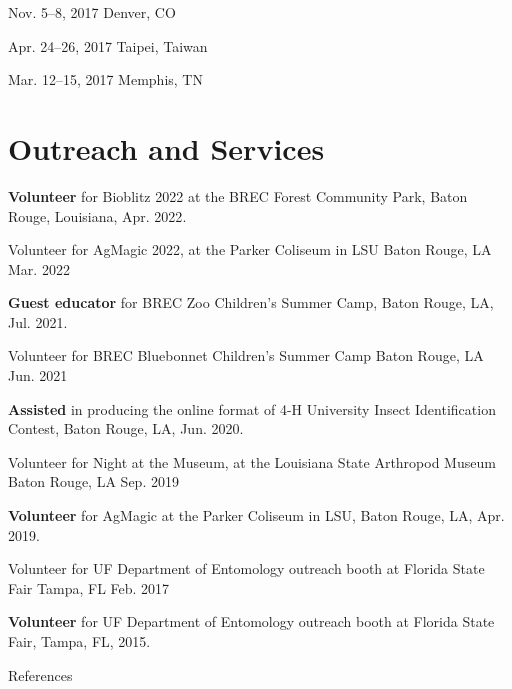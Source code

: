 \documentclass{article}
\begin{document}
{Nov. 5--8, 2017}
{Denver, CO}

{Apr. 24--26, 2017}
{Taipei, Taiwan}

{Mar. 12--15, 2017}
{Memphis, TN}


\section{Outreach and Services}
\newcommand{\outreach}[5]{
    \noindent
    \normalsize
    \textbf{#1} %
    {#2}, %
    \small
    {#3}, %
    {#4}. %
    \normalsize\par
}

\outreach{Volunteer}
{for Bioblitz 2022 at the BREC Forest Community Park}
{Baton Rouge, Louisiana}
{Apr. 2022}

\outreach{Volunteer}
{for AgMagic 2022, at the Parker Coliseum in LSU}
{Baton Rouge, LA}
{Mar. 2022}

\outreach{Guest educator}
{for BREC Zoo Children’s Summer Camp}
{Baton Rouge, LA}
{Jul. 2021}

\outreach{Volunteer}
{for BREC Bluebonnet Children’s Summer Camp}
{Baton Rouge, LA}
{Jun. 2021}

\outreach{Assisted}
{in producing the online format of 4-H University Insect Identification Contest}
{Baton Rouge, LA}
{Jun. 2020}

\outreach{Volunteer}
{for Night at the Museum, at the Louisiana State Arthropod Museum}
{Baton Rouge, LA}
{Sep. 2019}

\outreach{Volunteer}
{for AgMagic at the Parker Coliseum in LSU}
{Baton Rouge, LA}
{Apr. 2019}

\outreach{Volunteer}
{for UF Department of Entomology outreach booth at Florida State Fair}
{Tampa, FL}
{Feb. 2017}

\outreach{Volunteer}
{for UF Department of Entomology outreach booth at Florida State Fair}
{Tampa, FL}
{2015}

\section{References}
\newcommand{\References}[5]{
    \noindent
    \begin{minipage}[t]{.25\textwidth}
    \textbf{#1} %
    \end{minipage}
    \begin{minipage}[t]{.70\textwidth}
    \noindent
    \small
    {#2}, %
    {#3}, %
    Email: {#4} %
    \end{minipage}
    \normalsize\par
}
\end{document}
